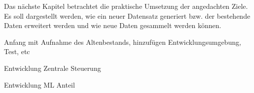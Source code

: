 Das nächste Kapitel betrachtet die praktische Umsetzung der angedachten Ziele. Es soll dargestellt werden, wie ein neuer Datensatz generiert bzw. der bestehende Daten erweitert werden und wie neue Daten gesammelt werden können. 

\begin{neu}
  Anfang mit Aufnahme des Altenbestands, hinzufügen Entwicklungsumgebung, Test, etc

  Entwicklung Zentrale Steuerung

  Entwicklung ML Anteil
\end{neu}
